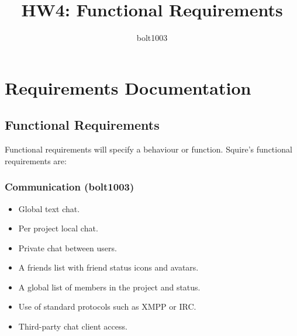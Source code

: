 \documentclass[11pt]{report}
\title{HW4: Functional Requirements}
\author{bolt1003}
\begin{document}
\maketitle


\chapter{Requirements Documentation}

\section{Functional Requirements}
    Functional requirements will specify a behaviour or function. Squire's functional requirements are:
    
    \subsection{Communication (bolt1003)}
        \begin{itemize}
            \item Global text chat.
            \item Per project local chat.
            \item Private chat between users.
            \item A friends list with friend status icons and avatars.
            \item A global list of members in the project and status.
            \item Use of standard protocols such as XMPP or IRC.
            \item Third-party chat client access.
        \end{itemize}
\end{document}
